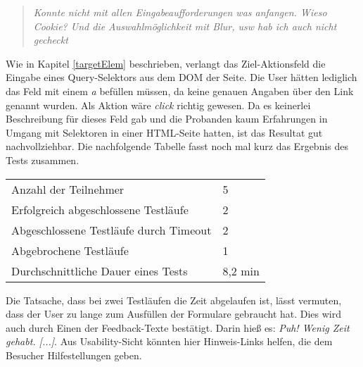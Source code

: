 \vspace{0.3cm}
\begin{quote}
     \glqq \textit{Konnte nicht mit allen Eingabeaufforderungen was anfangen.
    Wieso Cookie? Und die Auswahlmöglichkeit mit Blur, usw hab ich auch nicht gecheckt}\grqq{}
\end{quote}
\vspace{0.3cm}

Wie in Kapitel \ref{targetElem} beschrieben, verlangt das Ziel-Aktionsfeld die Eingabe eines Query-Selektors aus dem DOM der Seite. Die User hätten lediglich das Feld mit einem \glqq \textit{a}\grqq{} befüllen müssen, da keine genauen Angaben über den Link genannt wurden. Als Aktion wäre \glqq \textit{click}\grqq{} richtig gewesen. Da es keinerlei Beschreibung für dieses Feld gab und die Probanden kaum Erfahrungen in Umgang mit Selektoren in einer HTML-Seite hatten, ist das Resultat gut nachvollziehbar. Die nachfolgende Tabelle fasst noch mal kurz das Ergebnis des Tests zusammen.
\\
\begin{center}
{\footnotesize
\begin{tabular}{ p{6.5cm} p{1.1cm} }
  \hline
  Anzahl der Teilnehmer & 5\vspace{0.2cm}\\
  Erfolgreich abgeschlossene Testläufe & 2\vspace{0.2cm}\\
  Abgeschlossene Testläufe durch Timeout & 2\vspace{0.2cm}\\
  Abgebrochene Testläufe & 1\vspace{0.2cm}\\
  Durchschnittliche Dauer eines Tests & 8,2 min\\
  \hline
\end{tabular}
}
\vspace{0.3cm}
 \label{tab:title}
\vspace{0.3cm}
\end{center}

Die Tatsache, dass bei zwei Testläufen die Zeit abgelaufen ist, lässt vermuten, dass der User zu lange zum Ausfüllen der Formulare gebraucht hat. Dies wird auch durch Einen der Feedback-Texte bestätigt. Darin hieß es: \glqq \textit{Puh! Wenig Zeit gehabt. [...]}\grqq{}. Aus Usability-Sicht könnten hier Hinweis-Links helfen, die dem Besucher Hilfestellungen geben.